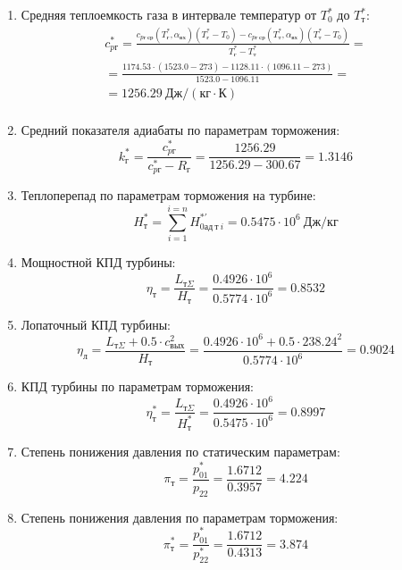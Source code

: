 \documentclass[a4paper,12pt]{article}
\begin{document}
\begin{enumerate}
        \item Средняя теплоемкость газа в интервале температур от $T_0^*$ до $T_т^*$:
        \begin{gather*}
            c_{pг}^* = \frac{
		         c_{pг\ ср} (T_г^*, \alpha_{вх}) (T_г^* - T_0) - c_{pг\ ср} (T_т^*, \alpha_{вх})(T_т^* - T_0)
		    }{
		        T_г^* - T_т^*} =\\
            =\frac{
                1174.53 \cdot
                (1523.0 - 273) -
		        1128.11 \cdot
                (1096.11 - 273)
		    }{
		        1523.0 - 1096.11} =\\
		     = 1256.29 \ Дж / (кг \cdot К)\\
        \end{gather*}

        \item Средний показателя адиабаты по параметрам торможения:
        \[
            k_г^* = \frac{ c_{pг}^* }{ c_{pг}^* - R_г } =
                \frac{
                    1256.29
                }{
                    1256.29 - 300.67
                }
            = 1.3146
        \]

        \item Теплоперепад по параметрам торможения на турбине:
        \[
            H_т^* = \sum_{i=1}^{i=n}H_{0ад\ т\ i}^{*\prime} =
            0.5475 \cdot 10^6 \ Дж/кг
        \]

        \item Мощностной КПД турбины:
        \[
            \eta_т = \frac{ L_{т\Sigma} }{ H_т } =
                \frac{ 0.4926 \cdot 10^6 }{ 0.5774 \cdot 10^6 } =
            0.8532
        \]

        \item Лопаточный КПД турбины:
        \[
            \eta_л = \frac{
                        L_{т\Sigma} + 0.5 \cdot c_{вых}^2
                    }{ H_т } =
            \frac{
                0.4926 \cdot 10^6 + 0.5 \cdot 238.24 ^ 2
            }{ 0.5774 \cdot 10^6 } =
            0.9024
        \]

        \item КПД турбины по параметрам торможения:
        \[
            \eta_т^* = \frac{ L_{т\Sigma} }{ H_т^* } =
                \frac{ 0.4926 \cdot 10^6 }{ 0.5475 \cdot 10^6 } =
            0.8997
        \]

        \item Степень понижения давления по статическим параметрам:
        \[
            \pi_{т} = \frac{p_{01}^*}{p_{2 2}} =
            \frac{1.6712}{0.3957} =
            4.224
        \]

        \item Степень понижения давления по параметрам торможения:
        \[
            \pi_{т}^* = \frac{p_{01}^*}{p_{2 2}^*} =
            \frac{1.6712}{0.4313} =
            3.874
        \]

    \end{enumerate}
    
\end{document}
